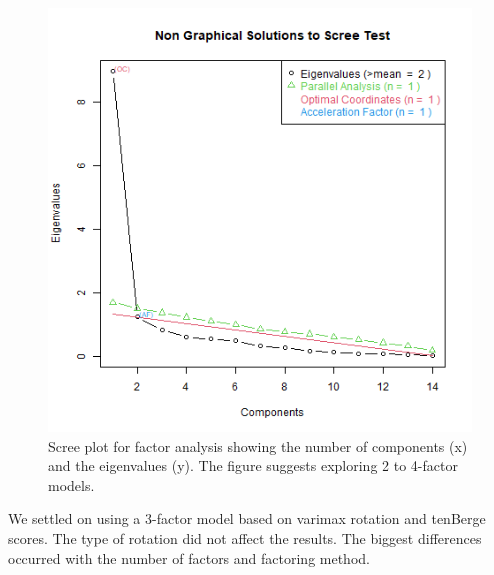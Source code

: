 \documentclass[020-persona\_validation.tex]{subfiles}
\begin{document}
        \begin{figure}[htb]
            \centering
            \includegraphics[scale=0.5]{figs/010-validation/efa_eigen_scree_good.png}
            \caption[Scree plot for factor analysis]
            {Scree plot for factor analysis showing the number of components (x) and the eigenvalues (y).
                The figure suggests exploring 2 to 4-factor models.
            }
            \label{fig:scree-fa-good}
        \end{figure}

        We settled on using a 3-factor model based on
        varimax rotation and
        tenBerge scores.
        The type of rotation did not affect the results.
        The biggest differences occurred with the number of factors and factoring method.
\end{document}

